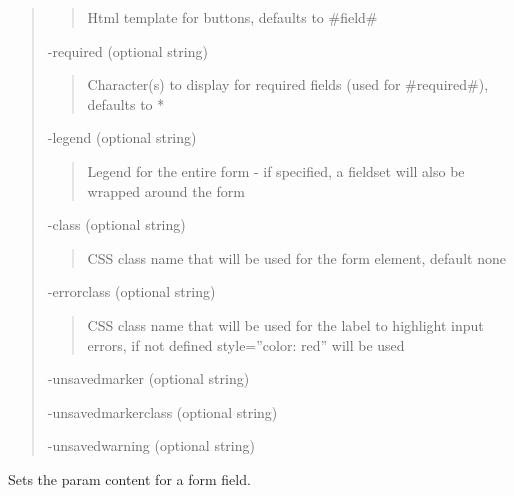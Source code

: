 \documentclass[letterpaper,10pt,english]{sphinxmanual}
\begin{document}
\begin{fulllineitems}
\begin{fulllineitems}
\begin{quote}
\begin{quote}
Html template for buttons, defaults to \#field\#
\end{quote}

-required (optional string)
\begin{quote}

Character(s) to display for required fields (used for \#required\#), defaults to *
\end{quote}

-legend (optional string)
\begin{quote}

Legend for the entire form - if specified, a fieldset will also be wrapped around the form
\end{quote}

-class (optional string)
\begin{quote}

CSS class name that will be used for the form element, default none
\end{quote}

-errorclass (optional string)
\begin{quote}

CSS class name that will be used for the label to highlight input errors, if not defined style=''color: red'' will be used
\end{quote}

-unsavedmarker (optional string)

-unsavedmarkerclass (optional string)

-unsavedwarning (optional string)
\end{quote}

\end{fulllineitems}


\begin{fulllineitems}
\label{knop_form:knop_form.setparam}
\end{fulllineitems}


\begin{fulllineitems}
Sets the param content for a form field.

\end{fulllineitems}


\end{fulllineitems}
\end{document}
